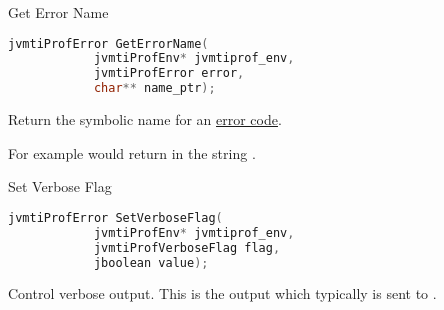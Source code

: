 \begin{apidef}{Get Error Name}
\begin{lstlisting}[language=C]
jvmtiProfError GetErrorName(
            jvmtiProfEnv* jvmtiprof_env,
            jvmtiProfError error,
            char** name_ptr);
\end{lstlisting}

\begin{apidesc}
Return the symbolic name for an \hyperref[api:ec]{error code}.

\medskip
For example  would return in  the string .
\end{apidesc}

\begin{apiphase}
\apiphaseany
\end{apiphase}

\begin{apicap}
\apicaprequired
\end{apicap}

\begin{apiparam}
\end{apiparam}

\begin{apierror}
\end{apierror}
\end{apidef}
\begin{apidef}{Set Verbose Flag}
\begin{lstlisting}[language=C]
jvmtiProfError SetVerboseFlag(
            jvmtiProfEnv* jvmtiprof_env,
            jvmtiProfVerboseFlag flag,
            jboolean value);
\end{lstlisting}

\begin{apidesc}
Control verbose output. This is the output which typically is sent to .
\end{apidesc}

\begin{apiphase}
\apiphaseany
\end{apiphase}

\begin{apicap}
\apicaprequired
\end{apicap}

\begin{apiparam}
\end{apiparam}

\begin{apierror}
\end{apierror}
\end{apidef}

